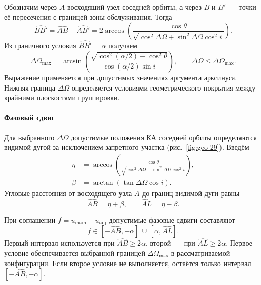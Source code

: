 Обозначим через $A$ восходящий узел соседней орбиты,
а через $B$ и $B'$~--- точки её пересечения с границей
зоны обслуживания. Тогда
\begin{equation}
    \widehat{BB'}
    =
    \widehat{AB}-\widehat{AB'}
    =
    2\arccos\!\left(
        \frac{\cos\theta}
        {\sqrt{
            \cos^2\Delta\Omega
            +\sin^2\Delta\Omega\cos^2 i
        }}
    \right).
    \label{eq:interplane-arc}
\end{equation}
Из граничного условия $\widehat{BB'}=\alpha$ получаем
\begin{equation}
    \Delta\Omega_{\max}
    =
    \arcsin\!\left(
        \frac{
            \sqrt{\cos^2(\alpha/2)-\cos^2\theta}
        }{
            \cos(\alpha/2)\sin i
        }
    \right),
    \qquad
    \Delta\Omega\leq\Delta\Omega_{\max}.
    \label{eq:interplane-raan}
\end{equation}
Выражение применяется при допустимых значениях аргумента
арксинуса. Нижняя граница $\Delta\Omega$ определяется
условиями геометрического покрытия между крайними
плоскостями группировки.

\paragraph{Фазовый сдвиг}

Для выбранного $\Delta\Omega$ допустимые положения КА
соседней орбиты определяются видимой дугой за исключением
запретного участка (рис.~\ref{fig:geo-29}).
Введём
\begin{align}
    \eta &=
    \arccos\!\left(
        \frac{\cos\theta}
        {\sqrt{
            \cos^2\Delta\Omega
            +\sin^2\Delta\Omega\cos^2 i
        }}
    \right),\\
    \beta &=
    \arctan\!\left(\tan\Delta\Omega\cos i\right).
\end{align}
Угловые расстояния от восходящего узла $A$ до границ
видимой дуги равны
\begin{equation}
    \widehat{AB}=\eta+\beta,
    \qquad
    \widehat{AL}=\eta-\beta.
    \label{eq:interplane-phase-arcs}
\end{equation}

При соглашении $f=u_{\mathrm{main}}-u_{\mathrm{adj}}$
допустимые фазовые сдвиги составляют
\begin{equation}
    f\in
    [-\widehat{AB},-\alpha]
    \,\cup\,
    [\alpha,\widehat{AL}].
    \label{eq:interplane-phase}
\end{equation}
Первый интервал используется при
$\widehat{AB}\geq2\alpha$, второй~--- при
$\widehat{AL}\geq2\alpha$.
Первое условие обеспечивается выбранной границей
$\Delta\Omega_{\max}$ в рассматриваемой конфигурации.
Если второе условие не выполняется, остаётся только
интервал $[-\widehat{AB},-\alpha]$.


